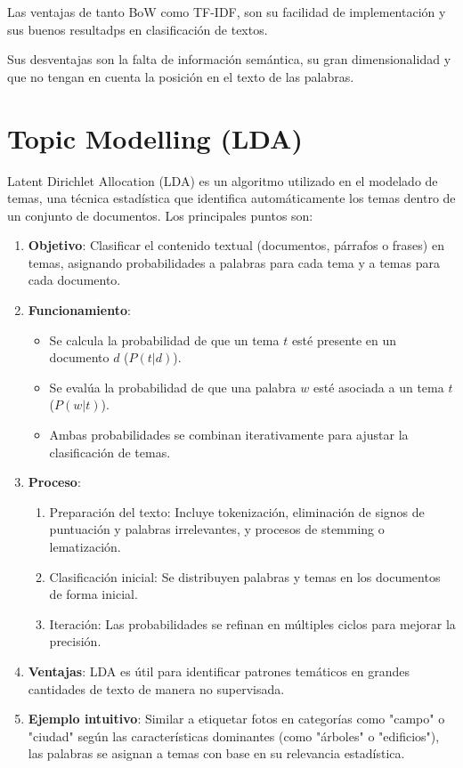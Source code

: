\documentclass{report}
\begin{document}
Las ventajas de tanto BoW como TF-IDF, son su facilidad de implementación y sus buenos resultadps en clasificación de textos.

Sus desventajas son la falta de información semántica, su gran dimensionalidad y que no tengan en cuenta la posición en el texto de las palabras.

\section{Topic Modelling (LDA)}
Latent Dirichlet Allocation (LDA) es un algoritmo utilizado en el modelado de temas, una técnica estadística que identifica automáticamente los temas dentro de un conjunto de documentos. Los principales puntos son:
\begin{enumerate}
\item{\textbf{Objetivo}:} Clasificar el contenido textual (documentos, párrafos o frases) en temas, asignando probabilidades a palabras para cada tema y a temas para cada documento.

\item{\textbf{Funcionamiento}:}
\begin{itemize}
    \item Se calcula la probabilidad de que un tema $t$ esté presente en un documento $d$ ($P(t|d)$).
    \item Se evalúa la probabilidad de que una palabra $w$ esté asociada a un tema $t$ ($P(w|t)$).
    \item Ambas probabilidades se combinan iterativamente para ajustar la clasificación de temas.
\end{itemize}

\item{\textbf{Proceso}:}
\begin{enumerate}
    \item Preparación del texto: Incluye tokenización, eliminación de signos de puntuación y palabras irrelevantes, y procesos de stemming o lematización.
    \item Clasificación inicial: Se distribuyen palabras y temas en los documentos de forma inicial.
    \item Iteración: Las probabilidades se refinan en múltiples ciclos para mejorar la precisión.
\end{enumerate}

\item{\textbf{Ventajas}:} LDA es útil para identificar patrones temáticos en grandes cantidades de texto de manera no supervisada.

\item{\textbf{Ejemplo intuitivo}:} Similar a etiquetar fotos en categorías como "campo" o "ciudad" según las características dominantes (como "árboles" o "edificios"), las palabras se asignan a temas con base en su relevancia estadística.
\end{enumerate}
\end{document}
